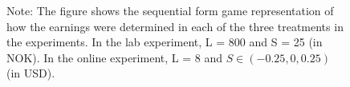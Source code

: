 \documentclass{article}
\begin{document}
\begin{figure}
\caption{Note: The figure shows the sequential form game representation of how the earnings were determined in each of the three treatments
in the experiments. In the lab experiment, L = 800 and S = 25 (in NOK). In the online experiment, L = 8 and $S\in (-0.25, 0, 0.25)$ (in USD).}
\label{fig:gametree}
\end{figure}
\end{document}
